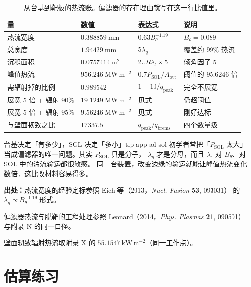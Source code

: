 \begin{table}[htbp]
\centering
\small
\caption{从台基到靶板的热流账。偏滤器的存在理由就写在这一行比值里。}
\label{tab:app-ad-sol}
\begin{tabular}{p{3.6cm}p{3.2cm}p{4.0cm}p{4.0cm}}
\toprule
量 & 数值 & 表达式 & 说明 \\
\midrule
热流宽度 & $0.388859\ \mathrm{mm}$ & $0.63B_\theta^{-1.19}$ & $B_\theta=0.089$ \\
总宽度 & $1.94429\ \mathrm{mm}$ & $5\lambda_q$ & 覆盖约 $99\%$ 热流 \\
沉积面积 & $0.0757414\ \mathrm{m^2}$ & $2\pi R\lambda_t\times5$ & 倾角因子 $5$ \\
峰值热流 & $956.246\ \mathrm{MW\,m^{-2}}$ & $0.7P_{\mathrm{SOL}}/A_{\mathrm{out}}$ & 阈值的 $95.6246$ 倍 \\
需辐射掉的比例 & $0.989542$ & $1-10/q_{\mathrm{peak}}$ & 完全不展宽 \\
展宽 $5$ 倍 + 辐射 $90\%$ & $19.1249\ \mathrm{MW\,m^{-2}}$ & 见式 & 仍超阈值 \\
展宽 $5$ 倍 + 辐射 $95\%$ & $9.56246\ \mathrm{MW\,m^{-2}}$ & 见式 & 刚好达标 \\
与壁面韧致之比 & $17337.5$ & $q_{\mathrm{peak}}/q_{\mathrm{brems}}$ & 四个数量级 \\
\bottomrule
\end{tabular}

\end{table}

\begin{tip}{台基决定「有多少」，SOL 决定「多小」}{tip-app-ad-sol}
初学者常把「$P_{\mathrm{SOL}}$ 太大」当成偏滤器的唯一问题。其实 $P_{\mathrm{SOL}}$ 只是分子，
$\lambda_q$ 才是分母，而且 $\lambda_q$ 对 $B_\theta$、对 SOL 中的湍流输运都很敏感。
同一台装置，改变边缘的输运就能让峰值热流变化数倍，这比改材料容易得多。
\end{tip}

{\footnotesize
\textbf{出处：}热流宽度的经验定标参照 Eich 等（2013，\emph{Nucl. Fusion} \textbf{53}, 093031）
的 $\lambda_q\propto B_\theta^{-1.19}$ 形式。

偏滤器热流与脱靶的工程处理参照
Leonard（2014，\emph{Phys. Plasmas} \textbf{21}, 090501）与附录 N 的同一口径。

壁面轫致辐射热流取附录 X 的 $55.1547\ \mathrm{kW\,m^{-2}}$（同一工作点）。
}

\section{估算练习}
\label{sec:app-ad-problems}

